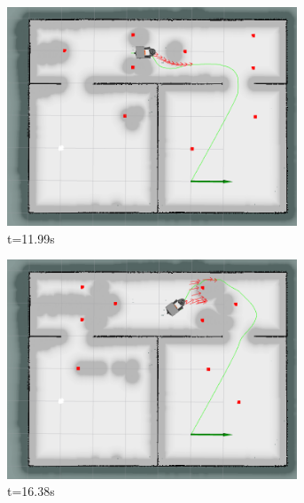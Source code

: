 \begin{figure}[!ht]
\begin{subfigure}[b]{0.35\linewidth}
    \end{subfigure}%
    \begin{subfigure}[b]{0.35\linewidth}
        \centering
        \includegraphics[width=0.95\textwidth]{images/teb_double/2/1949.png} \caption{t=11.99s}
    \end{subfigure}
    \begin{subfigure}[b]{0.35\linewidth}
        \centering
        \includegraphics[width=0.95\textwidth]{images/teb_double/2/2388.png} \caption{t=16.38s}
    \end{subfigure}%
    \begin{subfigure}[b]{0.35\linewidth}
        \centering

\end{subfigure}
\end{figure}
